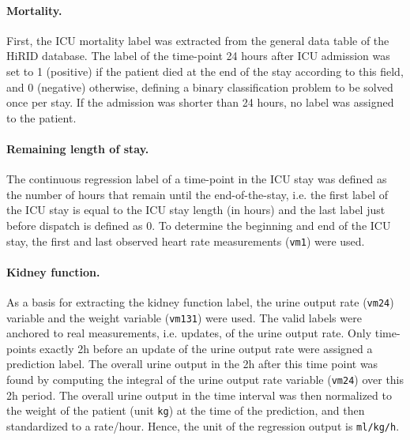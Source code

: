 \documentclass{article}
\begin{document}
\paragraph{Mortality.}First, the ICU mortality label was extracted from the general data table of the HiRID database. 
The label of the time-point 24 hours after ICU admission was set to 1 (positive) if the patient died at the end of the stay according
to this field, and 0 (negative) otherwise, defining a binary classification problem to be solved once per stay. 
If the admission was shorter than 24 hours, no label was assigned to the patient. 

\paragraph{Remaining length of stay.}The continuous regression label of a time-point in the ICU stay was defined as the number of hours that remain until the end-of-the-stay, 
i.e. the first label of the ICU stay is equal to the ICU stay length (in hours) and the last label just before dispatch is defined as 0. To determine the beginning and end of the ICU stay, the first and last observed heart rate measurements (\texttt{vm1}) were used.

\paragraph{Kidney function.}As a basis for extracting the kidney function label, the urine output rate (\texttt{vm24}) variable and the weight variable (\texttt{vm131}) were used. The valid labels were anchored to real measurements, i.e. updates, of the urine output rate. Only time-points exactly 2h before an update of the urine output rate were assigned a prediction label. The overall urine output in the 2h after this time point was found by computing the integral of the urine output rate variable (\texttt{vm24}) over this 2h period. The overall urine output in the time interval was then normalized to the weight of the patient (unit \texttt{kg}) at the time of the prediction, and
then standardized to a rate/hour. Hence, the unit of the regression output is 
\texttt{ml/kg/h}.
\end{document}
